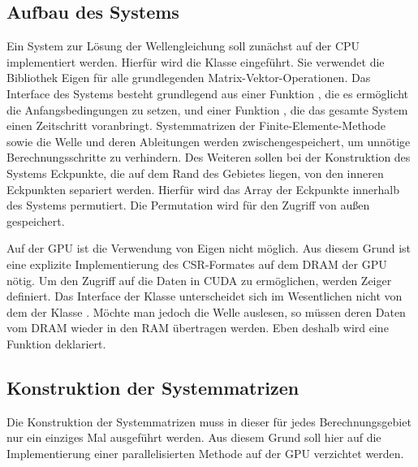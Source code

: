 \documentclass[crop=false,10pt,ngerman]{standalone}
\begin{document}
    \subsection{Aufbau des Systems} %
    \label{sub:aufbau_des_systems}
      Ein System zur Lösung der Wellengleichung soll zunächst auf der CPU implementiert werden.
      Hierfür wird die Klasse  eingeführt.
      Sie verwendet die Bibliothek Eigen für alle grundlegenden Matrix-Vektor-Operationen.
      Das Interface des Systems besteht grundlegend aus einer Funktion , die es ermöglicht die Anfangsbedingungen zu setzen, und einer Funktion , die das gesamte System einen Zeitschritt voranbringt.
      Systemmatrizen der Finite-Elemente-Methode sowie die Welle und deren Ableitungen werden zwischengespeichert, um unnötige Berechnungsschritte zu verhindern.
      Des Weiteren sollen bei der Konstruktion des Systems Eckpunkte, die auf dem Rand des Gebietes liegen, von den inneren Eckpunkten separiert werden.
      Hierfür wird das Array der Eckpunkte innerhalb des Systems permutiert.
      Die Permutation wird für den Zugriff von außen gespeichert.

      Auf der GPU ist die Verwendung von Eigen nicht möglich.
      Aus diesem Grund ist eine explizite Implementierung des CSR-Formates auf dem DRAM der GPU nötig.
      Um den Zugriff auf die Daten in CUDA zu ermöglichen, werden Zeiger definiert.
      Das Interface der Klasse  unterscheidet sich im Wesentlichen nicht von dem der Klasse .
      Möchte man jedoch die Welle auslesen, so müssen deren Daten vom DRAM wieder in den RAM übertragen werden.
      Eben deshalb wird eine Funktion  deklariert.


    \subsection{Konstruktion der Systemmatrizen} %
    \label{sub:konstruktion_der_mass_und_stiffness_matrix}
      Die Konstruktion der Systemmatrizen muss in dieser für jedes Berechnungsgebiet nur ein einziges Mal ausgeführt werden.
      Aus diesem Grund soll hier auf die Implementierung einer parallelisierten Methode auf der GPU verzichtet werden.
\end{document}
